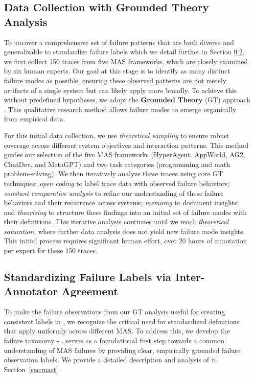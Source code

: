 \subsection{Data Collection with Grounded Theory Analysis}
\label{sec:gt_study}
To uncover a comprehensive set of failure patterns that are both diverse and generalizable to standardize failure labels which we detail further in Section \ref{sec:taxonomy_development}, we first collect 150 traces from five MAS frameworks, which are closely examined by six human experts. Our goal at this stage is to identify as many distinct failure modes as possible, ensuring these observed patterns are not merely artifacts of a single system but can likely apply more broadly. To achieve this without predefined hypotheses, we adopt the \textbf{Grounded Theory} (GT) approach \citep{glaser1967discovery}. This qualitative research method allows failure modes to emerge organically from empirical data.

For this initial data collection, we use \emph{theoretical sampling} \citep{draucker2007theoretical} to ensure robust coverage across different system objectives and interaction patterns. This method guides our selection of the five MAS frameworks (HyperAgent, AppWorld, AG2, ChatDev, and MetaGPT) and two task categories (programming and math problem-solving). We then iteratively analyze these traces using core GT techniques: \emph{open coding} \citep{khandkar2009open} to label trace data with observed failure behaviors; \emph{constant comparative analysis} to refine our understanding of these failure behaviors and their recurrence across systems; \emph{memoing} to document insights; and \emph{theorizing} to structure these findings into an initial set of failure modes with their definitions. This iterative analysis continues until we reach \emph{theoretical saturation}, where further data analysis does not yield new failure mode insights. This initial process requires significant human effort, over 20 hours of annotation per expert for these 150 traces.

\subsection{Standardizing Failure Labels via Inter-Annotator Agreement}
\label{sec:taxonomy_development}
To make the failure observations from our GT analysis useful for creating consistent labels in \dataset{}, we recognize the critical need for standardized definitions that apply uniformly across different MAS. To address this, we develop the failure taxonomy - \taxonomy{}. \taxonomy{} serves as a foundational first step towards a common understanding of MAS failures by providing clear, empirically grounded failure observation labels. We provide a detailed description and analysis of \taxonomy{} in Section~\ref{sec:mast}.

